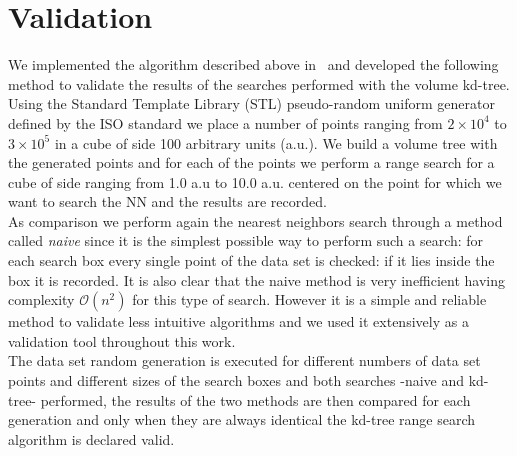 \section{Validation}
We implemented the algorithm described above in \CC\ and developed the following method to validate the results of the searches performed with the volume kd-tree.\\
Using the Standard Template Library (STL) pseudo-random uniform generator defined by the  ISO standard we place a number of points ranging from $2 \times 10^{4}$ to $3 \times 10^{5}$ in a cube of side 100 arbitrary units (a.u.). We build a volume tree with the generated points and for each of the points we perform a range search for a cube of side ranging from 1.0 a.u to 10.0 a.u. centered on the point for which we want to search the NN and the results are recorded.\\
As comparison we perform again the nearest neighbors search through a method called \textit{naive} since it is the simplest possible way to perform such a search: for each search box every single point of the data set is checked: if it lies inside the box it is recorded. It is also clear that the naive method is very inefficient having complexity $\mathcal{O}(n^{2})$ for this type of search. However it is a simple and reliable method to validate less intuitive algorithms and we used it extensively as a validation tool throughout this work.\\
The data set random generation is executed for different numbers of data set points and different sizes of the search boxes and both searches -naive and kd-tree- performed, the results of the two methods are then compared for each generation and only when they are always identical the kd-tree range search algorithm is declared valid.

